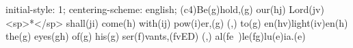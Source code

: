 initial-style: 1;
centering-scheme: english;
(c4)Be(g)hold,(g) our(hj) Lord(jv) <sp>*</sp> shall(ji) come(h) with(ij) pow(i)er,(g) (,) to(g) en(hv)light(iv)en(h) the(g) eyes(gh) of(g) his(g) ser(f)vants,(fvED) (,) al(fe~)le(fg)lu(e)ia.(e)

